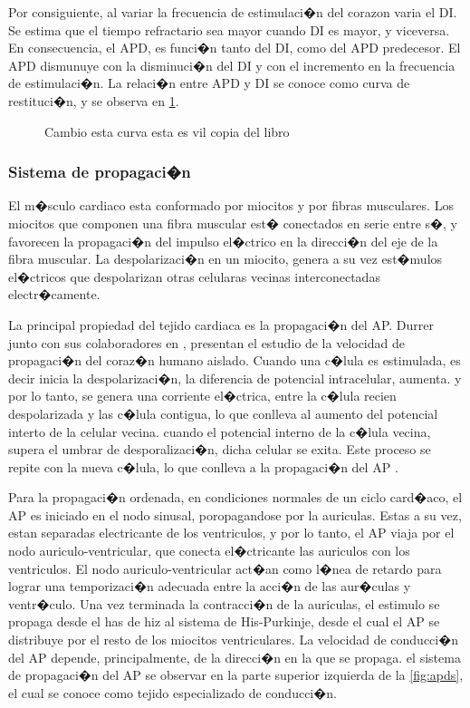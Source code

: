 Por consiguiente, al variar la frecuencia de estimulaci�n del corazon
varia el \ac{DI}. Se estima que el tiempo refractario sea
mayor cuando \ac{DI} es mayor, y viceversa. En consecuencia,
el \ac{APD}, es funci�n tanto del \ac{DI}, como del \ac{APD} predecesor.  El
\ac{APD} dismunuye con la disminuci�n del \ac{DI} y con el incremento en la
frecuencia de estimulaci�n. La relaci�n entre \ac{APD} y \ac{DI} se conoce como
curva de restituci�n, y se observa en \ref{fig:curvares}.

\begin{figure}[t]
\centering
\caption{Cambio esta curva  esta es vil copia del libro }
  \label{fig:curvares}
\end{figure}

\subsubsection{Sistema de propagaci�n }

El m�sculo cardiaco esta conformado por miocitos y por fibras
musculares. Los miocitos que componen una fibra muscular est� conectados en
serie entre s�, y favorecen la propagaci�n del impulso el�ctrico en la
direcci�n del eje de la fibra muscular. La despolarizaci�n en un miocito, genera
a su vez est�mulos el�ctricos que despolarizan otras celularas vecinas interconectadas electr�camente. 

La principal propiedad del tejido cardiaca  es la propagaci�n del \ac{AP}.
Durrer junto con sus colaboradores en \cite{durrer1970}, presentan el estudio de
la velocidad de propagaci�n del coraz�n humano aislado. Cuando una c�lula es
estimulada, es decir  inicia la despolarizaci�n, la diferencia de potencial
intracelular, aumenta. y por lo tanto, se genera una corriente el�ctrica, entre
la c�lula recien despolarizada  y las c�lula contigua, lo que conlleva al
aumento del potencial interto de la celular vecina. cuando el potencial interno
de la c�lula vecina,  supera el umbrar de desporalizaci�n, dicha celular se
exita. Este proceso se repite con la nueva c�lula, lo que conlleva a la
propagaci�n del \ac{AP} \cite{jalife2011}.

Para la propagaci�n ordenada, en
condiciones normales de un ciclo card�aco, el \ac{AP} es iniciado en el nodo
sinusal, poropagandose por la auriculas. Estas a su vez, estan separadas
electricante  de los ventriculos, y por lo tanto, el \ac{AP} viaja por el nodo
auriculo-ventricular, que conecta el�ctricante las auriculos  con los
ventriculos. El nodo auriculo-ventricular act�an como l�nea de retardo para
lograr una temporizaci�n adecuada entre la acci�n de las aur�culas y
ventr�culo. Una vez terminada la contracci�n de la auriculas, el estimulo  se
propaga desde el has de hiz al sistema de His-Purkinje, desde el cual el
\ac{AP}  se distribuye por el resto de los miocitos  ventriculares. La velocidad
de conducci�n del \ac{AP} depende, principalmente, de la direcci�n en la que se
propaga. el sistema de propagaci�n del \ac{AP} se observar en la parte superior
izquierda de la \ref{fig:apds}, el cual se conoce como tejido especializado de
conducci�n.

